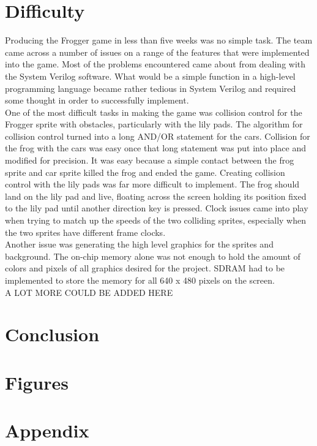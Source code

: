 \documentclass[journal, twocolumn, final,11pt,letterpaper]{IEEEtran}
\begin{document}
\section{ Difficulty}
Producing the Frogger game in less than five weeks was no simple task.  The team came across a number of issues on a range of the features that were implemented into the game.  Most of the problems encountered came about from dealing with the System Verilog software.  What would be a simple function in a high-level programming language became rather tedious in System Verilog and required some thought in order to successfully implement.  \\

One of the most difficult tasks in making the game was collision control for the Frogger sprite with obstacles, particularly with the lily pads.  The algorithm for collision control turned into a long AND/OR statement for the cars.  Collision for the frog with the cars was easy once that long statement was put into place and modified for precision.  It was easy because a simple contact between the frog sprite and car sprite killed the frog and ended the game.  Creating collision control with the lily pads was far more difficult to implement.  The frog should land on the lily pad and live, floating across the screen holding its position fixed to the lily pad until another direction key is pressed.  Clock issues came into play when trying to match up the speeds of the two colliding sprites, especially when the two sprites have different frame clocks.  \\

Another issue was generating the high level graphics for the sprites and background.  The on-chip memory alone was not enough to hold the amount of colors and pixels of all graphics desired for the project.  SDRAM had to be implemented to store the memory for all 640 x 480 pixels on the screen. \\

A LOT MORE COULD BE ADDED HERE\\

\section{Conclusion} 



\section{Figures}
\section*{Appendix}


%
%     
\end{document}
